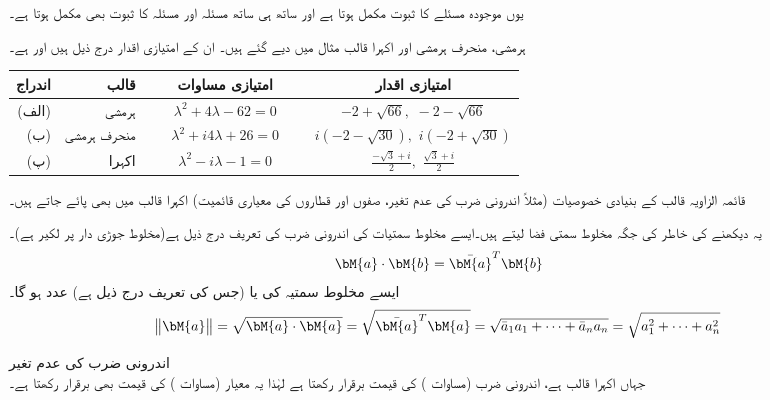 یوں موجودہ مسئلے کا ثبوت مکمل ہوتا ہے اور ساتھ ہی ساتھ مسئلہ  اور مسئلہ  کا ثبوت بھی مکمل ہوتا ہے۔

ہرمشی، منحرف ہرمشی اور اکہرا قالب مثال  میں دیے گئے ہیں۔ ان کے امتیازی اقدار درج ذیل ہیں   اور  ہے۔

\begin{tabular}{rrcc}
اندراج& قالب& امتیازی مساوات& امتیازی اقدار\\
\hline
(الف)& ہرمشی&
$\phantom{xxx}\lambda^2+4\lambda-62=0\phantom{xxx}$ & $-2+\sqrt{66},\,\,-2-\sqrt{66}$\Tstrut\Bstrut\\
(ب)& منحرف ہرمشی&
$\lambda^2+i4\lambda+26=0$ & $i(-2-\sqrt{30}),\,\, i(-2+\sqrt{30})$\\
(پ)& اکہرا&
$\lambda^2-i\lambda-1=0$ & $\frac{-\sqrt{3}+i}{2},\,\,\frac{\sqrt{3}+i}{2}$
\end{tabular}

قائمہ الزاویہ قالب کے بنیادی خصوصیات (مثلاً اندرونی ضرب کی عدم تغیر، صفوں اور قطاروں کی معیاری قائمیت) اکہرا قالب میں بھی پائے جاتے ہیں۔ 

یہ دیکھنے کی خاطر   کی جگہ مخلوط سمتی فضا  لیتے ہیں۔ایسے مخلوط سمتیات کی اندرونی ضرب کی تعریف درج ذیل ہے(مخلوط جوڑی دار پر لکیر ہے)۔
\begin{align}\label{مساوات_امتیازی_اندرونی_ضرب_مخلوط}
\bM{a}\cdot \bM{b}=\bar{\bM{a}}^T\bM{b}
\end{align}
ایسے  مخلوط سمتیہ کی  یا  (جس کی تعریف درج ذیل ہے)   عدد ہو گا۔ 
\begin{align}\label{مساوات_امتیازی_معیار_مخلوط}
\norm{\bM{a}}=\sqrt{\bM{a}\cdot\bM{a}}=\sqrt{\bar{\bM{a}}^T\bM{a}}=\sqrt{\bar{a}_1a_1+\cdots+\bar{a}_na_n}=\sqrt{a_1^2+\cdots+a_n^2}
\end{align}

\quad اندرونی ضرب کی عدم تغیر\\
  جہاں  اکہرا قالب ہے، اندرونی ضرب (مساوات ) کی قیمت برقرار رکھتا ہے لہٰذا یہ معیار (مساوات ) کی قیمت بھی برقرار رکھتا ہے۔

